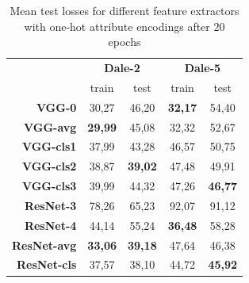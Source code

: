 \begin{table}[h]
    \centering
    \begin{tabular}{rcccc}
        \toprule
                            & \multicolumn{2}{c}{\textbf{Dale-2}} & \multicolumn{2}{c}{\textbf{Dale-5}}                                   \\\cmidrule(lr){2-3}\cmidrule(lr){4-5}
                            & train                               & test                                & train          & test           \\\midrule
        \textbf{VGG-0}      & 30,27                               & 46,20                               & \textbf{32,17} & 54,40          \\
        \textbf{VGG-avg}    & \textbf{29,99}                      & 45,08                               & 32,32          & 52,67          \\
        \textbf{VGG-cls1}   & 37,99                               & 43,28                               & 46,57          & 50,75          \\
        \textbf{VGG-cls2}   & 38,87                               & \textbf{39,02}                      & 47,48          & 49,91          \\
        \textbf{VGG-cls3}   & 39,99                               & 44,32                               & 47,26          & \textbf{46,77} \\\midrule
        \textbf{ResNet-3}   & 78,26                               & 65,23                               & 92,07          & 91,12          \\
        \textbf{ResNet-4}   & 44,14                               & 55,24                               & \textbf{36,48} & 58,28          \\
        \textbf{ResNet-avg} & \textbf{33,06}                      & \textbf{39,18}                      & 47,64          & 46,38          \\
        \textbf{ResNet-cls} & 37,57                               & 38,10                               & 44,72          & \textbf{45,92} \\
        \bottomrule
    \end{tabular}
    \caption{Mean test losses for different feature extractors with one-hot attribute encodings after 20 epochs}
    \label{tab:feature-extractor-mean-distances}
\end{table}

